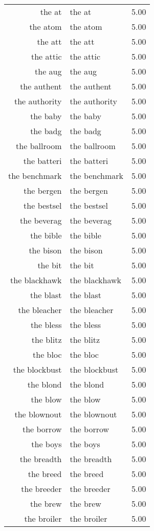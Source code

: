 \begin{table}[ht]
\begin{tabular}{rlr}
  the at & the at & 5.00 \\ 
  the atom & the atom & 5.00 \\ 
  the att & the att & 5.00 \\ 
  the attic & the attic & 5.00 \\ 
  the aug & the aug & 5.00 \\ 
  the authent & the authent & 5.00 \\ 
  the authority & the authority & 5.00 \\ 
  the baby & the baby & 5.00 \\ 
  the badg & the badg & 5.00 \\ 
  the ballroom & the ballroom & 5.00 \\ 
  the batteri & the batteri & 5.00 \\ 
  the benchmark & the benchmark & 5.00 \\ 
  the bergen & the bergen & 5.00 \\ 
  the bestsel & the bestsel & 5.00 \\ 
  the beverag & the beverag & 5.00 \\ 
  the bible & the bible & 5.00 \\ 
  the bison & the bison & 5.00 \\ 
  the bit & the bit & 5.00 \\ 
  the blackhawk & the blackhawk & 5.00 \\ 
  the blast & the blast & 5.00 \\ 
  the bleacher & the bleacher & 5.00 \\ 
  the bless & the bless & 5.00 \\ 
  the blitz & the blitz & 5.00 \\ 
  the bloc & the bloc & 5.00 \\ 
  the blockbust & the blockbust & 5.00 \\ 
  the blond & the blond & 5.00 \\ 
  the blow & the blow & 5.00 \\ 
  the blownout & the blownout & 5.00 \\ 
  the borrow & the borrow & 5.00 \\ 
  the boys & the boys & 5.00 \\ 
  the breadth & the breadth & 5.00 \\ 
  the breed & the breed & 5.00 \\ 
  the breeder & the breeder & 5.00 \\ 
  the brew & the brew & 5.00 \\ 
  the broiler & the broiler & 5.00 \\ 

\end{tabular}
\end{table}
